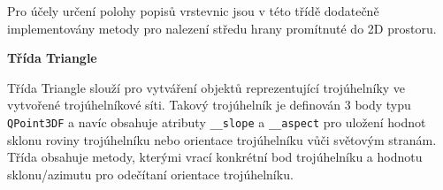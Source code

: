 \par Pro účely určení polohy popisů vrstevnic jsou v této třídě dodatečně implementovány metody pro nalezení středu hrany promítnuté do 2D prostoru.
\bigbreak
\par {\large\textbf{Třída Triangle} }
\par Třída Triangle slouží pro vytváření objektů reprezentující trojúhelníky ve vytvořené trojúhelníkové síti. Takový trojúhelník je definován 3 body typu \verb|QPoint3DF| a navíc obsahuje atributy \verb|__slope| a \verb|__aspect| pro uložení hodnot sklonu roviny trojúhelníku nebo orientace trojúhelníku vůči světovým stranám. Třída obsahuje metody, kterými vrací konkrétní bod trojúhelníku a hodnotu sklonu/azimutu pro odečítaní orientace trojúhelníku.

